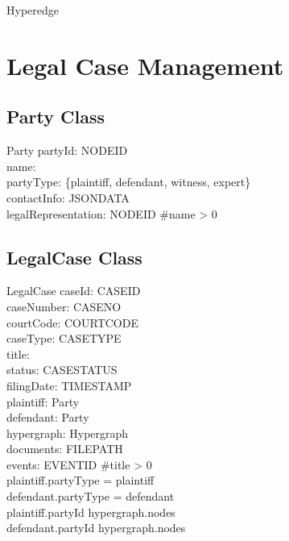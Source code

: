 \documentclass{article}
\begin{document}
\begin{class}{Hyperedge}
\newpage

\section{Legal Case Management}

\subsection{Party Class}

\begin{class}{Party}
    partyId: NODEID \\
    name: \seq \char \\
    partyType: \{plaintiff, defendant, witness, expert\} \\
    contactInfo: JSONDATA \\
    legalRepresentation: \power NODEID
\where
    \#name > 0
\end{class}

\subsection{LegalCase Class}

\begin{class}{LegalCase}
    caseId: CASEID \\
    caseNumber: CASENO \\
    courtCode: COURTCODE \\
    caseType: CASETYPE \\
    title: \seq \char \\
    status: CASESTATUS \\
    filingDate: TIMESTAMP \\
    plaintiff: Party \\
    defendant: Party \\
    hypergraph: Hypergraph \\
    documents: \power FILEPATH \\
    events: \seq EVENTID
\where
    \#title > 0 \\
    plaintiff.partyType = plaintiff \\
    defendant.partyType = defendant \\
    plaintiff.partyId \in \dom hypergraph.nodes \\
    defendant.partyId \in \dom hypergraph.nodes
\end{class}


\end{class}
\end{document}

